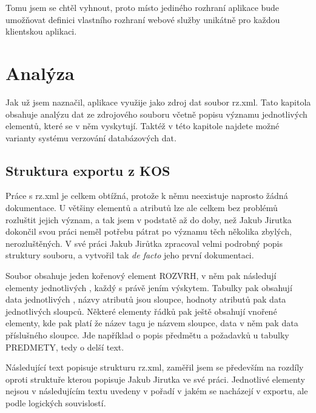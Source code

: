 \documentclass[11pt,twoside,a4paper]{book}
\begin{document}
Tomu jsem se chtěl vyhnout, proto místo jediného rozhraní aplikace bude umožňovat definici vlastního rozhraní webové služby unikátně pro každou klientskou aplikaci.


\chapter{Analýza}

Jak už jsem naznačil, aplikace využije jako zdroj dat soubor rz.xml. Tato kapitola obsahuje analýzu dat ze zdrojového souboru včetně popisu významu jednotlivých elementů, které se v něm vyskytují. Taktéž v této kapitole najdete možné varianty systému verzování databázových dat.

\section{Struktura exportu z KOS}
Práce s rz.xml je celkem obtížná, protože k němu neexistuje naprosto žádná dokumentace. U většiny elementů a atributů lze ale celkem bez problémů rozluštit jejich význam, a tak jsem v podstatě až do doby, než Jakub Jirutka\cite{jirutka} dokončil svou práci neměl potřebu pátrat po významu těch několika zbylých, nerozluštěných. V své práci Jakub Jirůtka zpracoval velmi podrobný popis struktury souboru, a vytvořil tak \textit{de facto} jeho první dokumentaci. 

Soubor obsahuje jeden kořenový element ROZVRH, v něm pak následují elementy jednotlivých , každý s právě jením výskytem. Tabulky pak obsahují data jednotlivých , názvy atributů jsou sloupce, hodnoty atributů pak data jednotlivých sloupců. Některé elementy řádků pak ještě obsahují vnořené elementy, kde pak platí že název tagu je názvem sloupce, data v něm pak data příslušného sloupce. Jde například o popis předmětu a požadavků u tabulky PREDMETY, tedy o delší text.

Následující text popisuje strukturu rz.xml, zaměřil jsem se především na rozdíly oproti struktuře kterou popisuje Jakub Jirutka ve své práci\cite{jirutka}. Jednotlivé elementy nejsou v následujícím textu uvedeny v pořadí v jakém se nacházejí v exportu, ale podle logických souvislostí.
\end{document}
